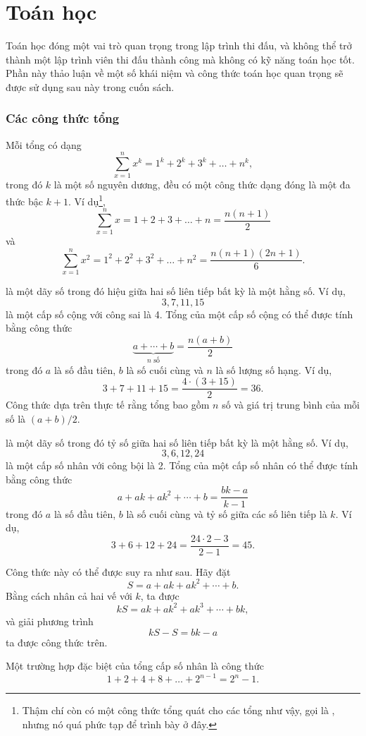 \section{Toán học}

Toán học đóng một vai trò quan trọng trong lập trình
thi đấu, và không thể trở thành
một lập trình viên thi đấu thành công mà không
có kỹ năng toán học tốt.
Phần này thảo luận về một số khái niệm
và công thức toán học quan trọng sẽ
được sử dụng sau này trong cuốn sách.

\subsubsection{Các công thức tổng}

Mỗi tổng có dạng
\[\sum_{x=1}^n x^k = 1^k+2^k+3^k+\ldots+n^k,\]
trong đó $k$ là một số nguyên dương,
đều có một công thức dạng đóng là một
đa thức bậc $k+1$.
Ví dụ\footnote{
Thậm chí còn có một công thức tổng quát cho các tổng như vậy, gọi là ,
nhưng nó quá phức tạp để trình bày ở đây.},
\[\sum_{x=1}^n x = 1+2+3+\ldots+n = \frac{n(n+1)}{2}\]
và
\[\sum_{x=1}^n x^2 = 1^2+2^2+3^2+\ldots+n^2 = \frac{n(n+1)(2n+1)}{6}.\]

 là một 
dãy số
trong đó hiệu giữa hai số liên tiếp bất kỳ
là một hằng số.
Ví dụ,
\[3, 7, 11, 15\]
là một cấp số cộng với công sai là 4.
Tổng của một cấp số cộng có thể được tính
bằng công thức
\[\underbrace{a + \cdots + b}_{n \,\, \textrm{số}} = \frac{n(a+b)}{2}\]
trong đó $a$ là số đầu tiên,
$b$ là số cuối cùng và
$n$ là số lượng số hạng.
Ví dụ,
\[3+7+11+15=\frac{4 \cdot (3+15)}{2} = 36.\]
Công thức dựa trên thực tế
rằng tổng bao gồm $n$ số và
giá trị trung bình của mỗi số là $(a+b)/2$.

 là một dãy số
trong đó tỷ số giữa hai số liên tiếp bất kỳ
là một hằng số.
Ví dụ,
\[3,6,12,24\]
là một cấp số nhân với công bội là 2.
Tổng của một cấp số nhân có thể được tính
bằng công thức
\[a + ak + ak^2 + \cdots + b = \frac{bk-a}{k-1}\]
trong đó $a$ là số đầu tiên,
$b$ là số cuối cùng và
tỷ số giữa các số liên tiếp là $k$.
Ví dụ,
\[3+6+12+24=\frac{24 \cdot 2 - 3}{2-1} = 45.\]

Công thức này có thể được suy ra như sau. Hãy đặt
\[ S = a + ak + ak^2 + \cdots + b .\]
Bằng cách nhân cả hai vế với $k$, ta được
\[ kS = ak + ak^2 + ak^3 + \cdots + bk,\]
và giải phương trình
\[ kS-S = bk-a\]
ta được công thức trên.

Một trường hợp đặc biệt của tổng cấp số nhân là công thức
\[1+2+4+8+\ldots+2^{n-1}=2^n-1.\]

